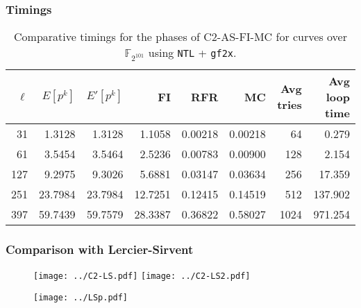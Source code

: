 \documentclass[10pt]{beamer}
\newcommand{\F}{\mathbb{F}}  %
\newcommand{\0}{\mathcal{O}}  %
\begin{document}

\begin{frame}
  \frametitle{Timings}
  
\begin{table}
  \small
  \centering
  \begin{tabular}{r r r r r r r r}
    \hline
    $\ell$ & $E[p^k]$ & $E'[p^k]$ & FI & RFR & MC & Avg tries & Avg loop time\\
    \hline
    31 & 1.3128 & 1.3128 & 1.1058 & 0.00218 & 0.00218 & 64 & 0.279\\
    61 & 3.5454 & 3.5464 & 2.5236 & 0.00783 & 0.00900 & 128 & 2.154 \\
    127 & 9.2975 & 9.3026 & 5.6881 & 0.03147 & 0.03634 & 256 & 17.359 \\
    251	& 23.7984 & 23.7984 & 12.7251 & 0.12415 & 0.14519 & 512 & 137.902 \\
    397 & 59.7439 & 59.7579 & 28.3387 & 0.36822 & 0.58027 & 1024 & 971.254 \\
    \hline
  \end{tabular}
  \caption{Comparative timings for the phases of C2-AS-FI-MC for curves over $\F_{2^{101}}$ using \texttt{NTL} + \texttt{gf2x}.}
  \label{tab:C2}
\end{table}

\end{frame}


\begin{frame}
  \frametitle{Comparison with Lercier-Sirvent}

  \begin{figure}
    \texttt{[image: ../C2-LS.pdf]}
    \hfill
    \texttt{[image: ../C2-LS2.pdf]}
  \end{figure}

  \begin{figure}
    \texttt{[image: ../LSp.pdf]}
  \end{figure}
\end{frame}

\end{document}
